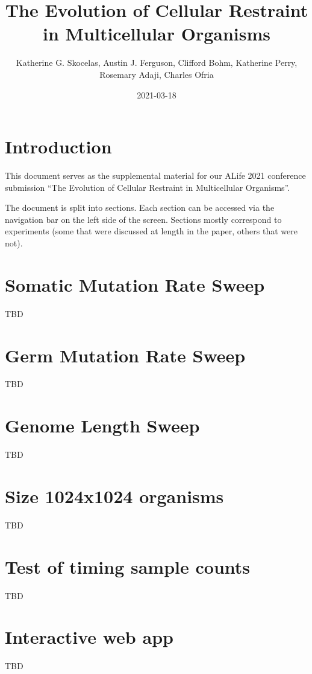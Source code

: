 \documentclass[]{book}
\title{The Evolution of Cellular Restraint in Multicellular Organisms}
\author{Katherine G. Skocelas, Austin J. Ferguson, Clifford Bohm, Katherine Perry, Rosemary Adaji, Charles Ofria}
\date{2021-03-18}
\begin{document}
\maketitle

{
\setcounter{tocdepth}{1}
\tableofcontents
}
\hypertarget{introduction}{%
\chapter{Introduction}\label{introduction}}

This document serves as the supplemental material for our ALife 2021 conference submission ``The Evolution of Cellular Restraint in Multicellular Organisms''.

The document is split into sections.
Each section can be accessed via the navigation bar on the left side of the screen.
Sections mostly correspond to experiments (some that were discussed at length in the paper, others that were not).

\hypertarget{somatic-mutation-rate-sweep}{%
\chapter{Somatic Mutation Rate Sweep}\label{somatic-mutation-rate-sweep}}

TBD

\hypertarget{germ-mutation-rate-sweep}{%
\chapter{Germ Mutation Rate Sweep}\label{germ-mutation-rate-sweep}}

TBD

\hypertarget{genome-length-sweep}{%
\chapter{Genome Length Sweep}\label{genome-length-sweep}}

TBD

\hypertarget{size-1024x1024-organisms}{%
\chapter{Size 1024x1024 organisms}\label{size-1024x1024-organisms}}

TBD

\hypertarget{test-of-timing-sample-counts}{%
\chapter{Test of timing sample counts}\label{test-of-timing-sample-counts}}

TBD

\hypertarget{interactive-web-app}{%
\chapter{Interactive web app}\label{interactive-web-app}}

TBD
\end{document}
